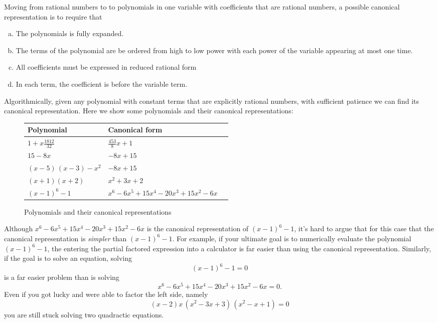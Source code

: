 \documentclass[12pt,fleqn]{article}
\newenvironment{alphalist}{
  \begin{enumerate}[(a)]
    \addtolength{\itemsep}{-0.5\itemsep}}
  {\end{enumerate}}
\begin{document}
Moving from rational numbers to to polynomials in one variable with coefficients that are rational numbers,  a possible canonical representation is to 
require that
\begin{alphalist}
  \item The polynomials is fully expanded.
  \item The terms of the polynomial are be ordered from high to low power with each power of the variable appearing at most one time.
  \item All coefficients must be expressed in reduced rational form
  \item In each term, the coefficient is before the variable term.
\end{alphalist}
Algorithmically, given any polynomial with constant terms that are explicitly rational numbers, with sufficient patience we can find its canonical representation. Here we show some polynomials and their canonical representations: 

\begin{figure}[h]
\center
\begin{tabular}{|m{5.18cm}|m{7.18cm}|@{}m{0pt}@{}} \hline 
\textbf{Polynomial}  & \textbf{Canonical form} \\[7pt]  \hline
$  1 +  x \frac{1812}{32}$   &  $  \frac{453}{8} x + 1 $ \\[7pt]  \hline 
$ 15 - 8 x$  & $-8 x + 15$ \\[7pt]  \hline 
$\left( x-5\right) \, \left( x-3\right) -{{x}^{2}} $  & $-8 x + 15$  \\[7pt]  \hline 
$   (x+1)(x+2) $ &  $ x^2 + 3 x + 2$  \\[7pt]  \hline 
$   {{\left( x-1\right) }^{6}}-1  $  & ${{x}^{6}}-6 {{x}^{5}}+15 {{x}^{4}}-20 {{x}^{3}}+15 {{x}^{2}}-6 x $ \\[7pt]  \hline
\end{tabular}
\caption{Polynomials and their canonical representations}
\end{figure}
Although ${{x}^{6}}-6 {{x}^{5}}+15 {{x}^{4}}-20 {{x}^{3}}+15 {{x}^{2}}-6 x $ is the canonical representation of ${{\left( x-1\right) }^{6}}-1$, it's
hard to argue that for this case that the canonical representation is \emph{simpler} than ${{\left( x-1\right) }^{6}}-1$. For example, if your ultimate goal is to  numerically evaluate the polynomial  ${{\left( x-1\right) }^{6}}-1$, the entering the partial factored expression into a calculator is far easier
than using the canonical representation.  Similarly, if the goal is to solve an equation, solving
\begin{equation*}
  {{\left( x-1\right) }^{6}}-1 = 0
\end{equation*}
is a far easier problem than is solving
\begin{equation*}
  {{x}^{6}}-6 {{x}^{5}}+15 {{x}^{4}}-20 {{x}^{3}}+15 {{x}^{2}}-6 x  = 0.
\end{equation*}
Even if you got lucky and were able to factor the left side, namely
\begin{equation*}
\left( x-2\right)  x\, \left( {{x}^{2}}-3 x+3\right) \, \left( {{x}^{2}}-x+1\right)  = 0
\end{equation*}
you are still stuck solving two quadractic equations. 
\end{document}
